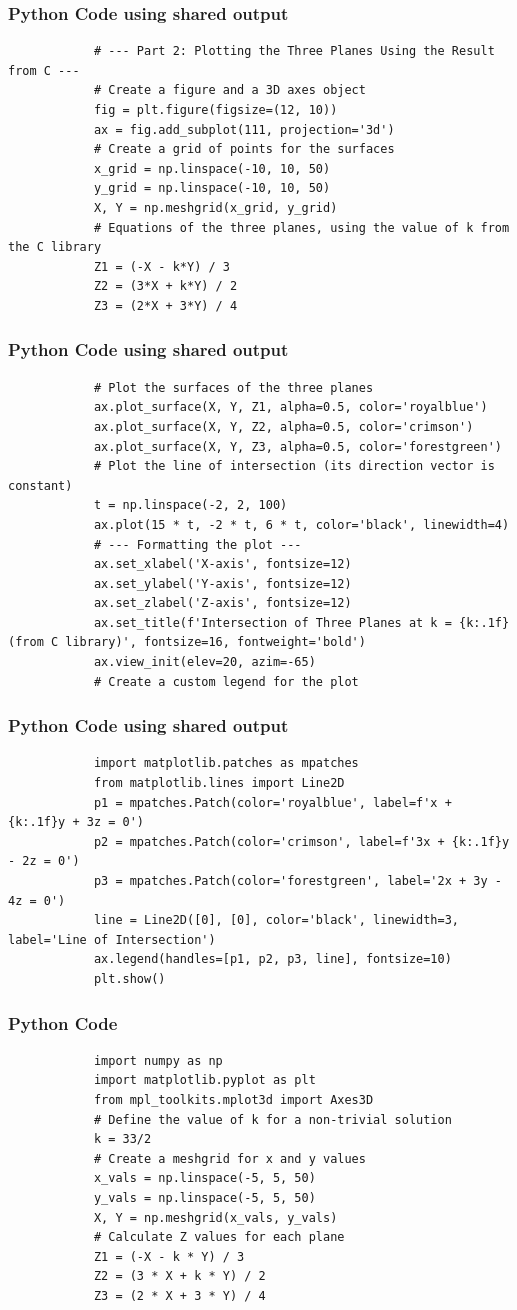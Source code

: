 \documentclass{beamer}
\begin{document}
	
	\begin{frame}[fragile]
		\frametitle{Python Code using shared output}
		\begin{lstlisting}
			# --- Part 2: Plotting the Three Planes Using the Result from C ---
			# Create a figure and a 3D axes object
			fig = plt.figure(figsize=(12, 10))
			ax = fig.add_subplot(111, projection='3d')
			# Create a grid of points for the surfaces
			x_grid = np.linspace(-10, 10, 50)
			y_grid = np.linspace(-10, 10, 50)
			X, Y = np.meshgrid(x_grid, y_grid)
			# Equations of the three planes, using the value of k from the C library
			Z1 = (-X - k*Y) / 3
			Z2 = (3*X + k*Y) / 2
			Z3 = (2*X + 3*Y) / 4
		\end{lstlisting}
	\end{frame}
	\begin{frame}[fragile]
		\frametitle{Python Code using shared output}
		\begin{lstlisting}        
			# Plot the surfaces of the three planes
			ax.plot_surface(X, Y, Z1, alpha=0.5, color='royalblue')
			ax.plot_surface(X, Y, Z2, alpha=0.5, color='crimson')
			ax.plot_surface(X, Y, Z3, alpha=0.5, color='forestgreen')
			# Plot the line of intersection (its direction vector is constant)
			t = np.linspace(-2, 2, 100)
			ax.plot(15 * t, -2 * t, 6 * t, color='black', linewidth=4)
			# --- Formatting the plot ---
			ax.set_xlabel('X-axis', fontsize=12)
			ax.set_ylabel('Y-axis', fontsize=12)
			ax.set_zlabel('Z-axis', fontsize=12)
			ax.set_title(f'Intersection of Three Planes at k = {k:.1f} (from C library)', fontsize=16, fontweight='bold')
			ax.view_init(elev=20, azim=-65)
			# Create a custom legend for the plot
		\end{lstlisting}
	\end{frame}
	\begin{frame}[fragile]
		\frametitle{Python Code using shared output}
		\begin{lstlisting}        
			import matplotlib.patches as mpatches
			from matplotlib.lines import Line2D
			p1 = mpatches.Patch(color='royalblue', label=f'x + {k:.1f}y + 3z = 0')
			p2 = mpatches.Patch(color='crimson', label=f'3x + {k:.1f}y - 2z = 0')
			p3 = mpatches.Patch(color='forestgreen', label='2x + 3y - 4z = 0')
			line = Line2D([0], [0], color='black', linewidth=3, label='Line of Intersection')
			ax.legend(handles=[p1, p2, p3, line], fontsize=10)
			plt.show()
		\end{lstlisting}
	\end{frame}
	\begin{frame}[fragile]
		\frametitle{Python Code}
		\begin{lstlisting}
			import numpy as np
			import matplotlib.pyplot as plt
			from mpl_toolkits.mplot3d import Axes3D
			# Define the value of k for a non-trivial solution
			k = 33/2
			# Create a meshgrid for x and y values
			x_vals = np.linspace(-5, 5, 50)
			y_vals = np.linspace(-5, 5, 50)
			X, Y = np.meshgrid(x_vals, y_vals)
			# Calculate Z values for each plane
			Z1 = (-X - k * Y) / 3
			Z2 = (3 * X + k * Y) / 2
			Z3 = (2 * X + 3 * Y) / 4
		\end{lstlisting}
		
	\end{frame}
\end{document}

